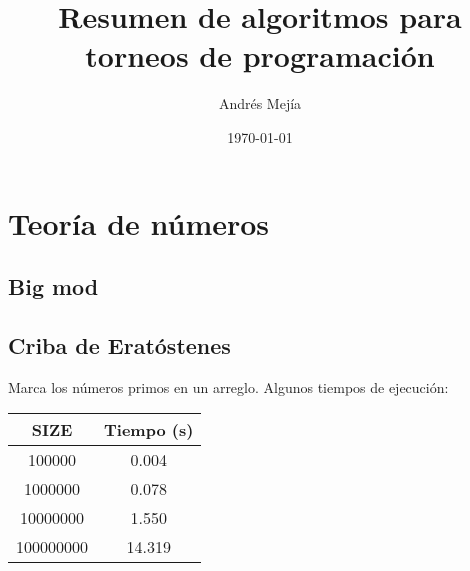 \documentclass[10pt,a4paper,twoside]{article}
\begin{document}
\title{Resumen de algoritmos para torneos de programación}
\author{Andrés Mejía}
\date{\today}
\maketitle

\tableofcontents
\lstlistoflistings
{}

\lstset{frame=tRBl}
\lstset{numbers=left, numberstyle=\tiny, stepnumber=2, numbersep=5pt}

\section{Teoría de números}
\subsection{Big mod}
\lstset{language=c++}


\subsection{Criba de Eratóstenes}
Marca los números primos en un arreglo. Algunos tiempos de ejecución:
\centering
\begin{tabular}{c c}
\hline\hline
SIZE & Tiempo (s) \\ [0.5ex]
\hline
100000 & 0.004 \\
1000000 & 0.078 \\
10000000 & 1.550 \\
100000000 & 14.319 \\ [1ex]
\hline
\end{tabular}

\end{document}
